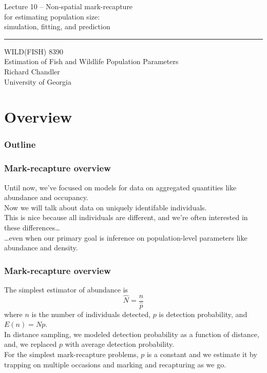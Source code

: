 \documentclass[color=usenames,dvipsnames]{beamer}\usepackage[]{graphicx}\usepackage[]{color}
\begin{document}
\begin{frame}[plain]
  \LARGE
  \centering
  {
    \LARGE Lecture 10 -- Non-spatial mark-recapture \\ for estimating
    population size: \\
    \Large simulation, fitting, and prediction \\
  }
  {\color{default} \rule{\textwidth}{0.1pt} }
  \vfill
  \large
  WILD(FISH) 8390 \\
  Estimation of Fish and Wildlife Population Parameters \\
  \vfill
  \large
  Richard Chandler \\
  University of Georgia \\
\end{frame}






\section{Overview}



\begin{frame}[plain]
  \frametitle{Outline}
  \Large
\end{frame}



\begin{frame}
  \frametitle{Mark-recapture overview}
  Until now, we've focused on models for data on aggregated quantities
  like abundance and occupancy. \\ 
  \pause
  \vfill
  Now we will talk about data on uniquely identifable individuals. \\
  \pause
  \vfill
  This is nice because all individuals are different, and we're often
  interested in these differences\dots \\
  \pause
  \vfill
  \dots even when our primary goal is
  inference on population-level parameters like abundance
  and density. \\
\end{frame}



\begin{frame}
  \frametitle{Mark-recapture overview}
  The simplest estimator of abundance is 
  \[
    \hat{N} = \frac{n}{\hat{p}}
  \]
  where $n$ is the number of individuals detected, $p$ is detection
  probability, and $E(n)=Np$. \\
  \pause
  \vfill
  In distance sampling, we modeled detection probability as a
  function of distance, and, we replaced $p$ with average detection
  probability. \\ 
  \pause
  \vfill
  For the simplest mark-recapture problems, $p$ is a constant and we
  estimate it by trapping on multiple occasions and marking and
  recapturing as we go.  
\end{frame}
\end{document}
